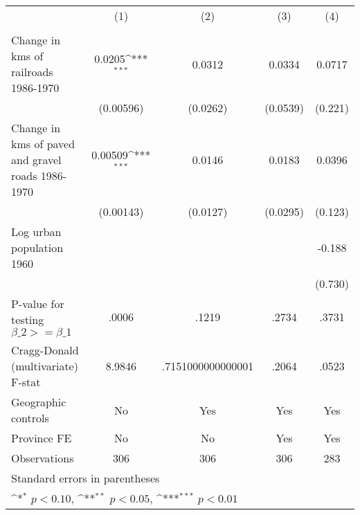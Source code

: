 {
\def\sym#1{\ifmmode^{#1}\else\(^{#1}\)\fi}
\begin{tabular}{l*{4}{c}}
\hline\hline
                &\multicolumn{1}{c}{(1)}&\multicolumn{1}{c}{(2)}&\multicolumn{1}{c}{(3)}&\multicolumn{1}{c}{(4)}\\
                &\multicolumn{1}{c}{}&\multicolumn{1}{c}{}&\multicolumn{1}{c}{}&\multicolumn{1}{c}{}\\
\hline
Change in kms of railroads 1986-1970&   0.0205\sym{***}&   0.0312         &   0.0334         &   0.0717         \\
                &(0.00596)         & (0.0262)         & (0.0539)         &  (0.221)         \\
[1em]
Change in kms of paved and gravel roads 1986-1970&  0.00509\sym{***}&   0.0146         &   0.0183         &   0.0396         \\
                &(0.00143)         & (0.0127)         & (0.0295)         &  (0.123)         \\
[1em]
Log urban population 1960&                  &                  &                  &   -0.188         \\
                &                  &                  &                  &  (0.730)         \\
\hline
P-value for testing $\beta\_{2} >= \beta\_{1}$&    .0006         &    .1219         &    .2734         &    .3731         \\
Cragg-Donald (multivariate) F-stat&   8.9846         &.7151000000000001         &    .2064         &    .0523         \\
Geographic controls&       No         &      Yes         &      Yes         &      Yes         \\
Province FE     &       No         &       No         &      Yes         &      Yes         \\
Observations    &      306         &      306         &      306         &      283         \\
\hline\hline
\multicolumn{5}{l}{\footnotesize Standard errors in parentheses}\\
\multicolumn{5}{l}{\footnotesize \sym{*} \(p<0.10\), \sym{**} \(p<0.05\), \sym{***} \(p<0.01\)}\\
\end{tabular}
}
